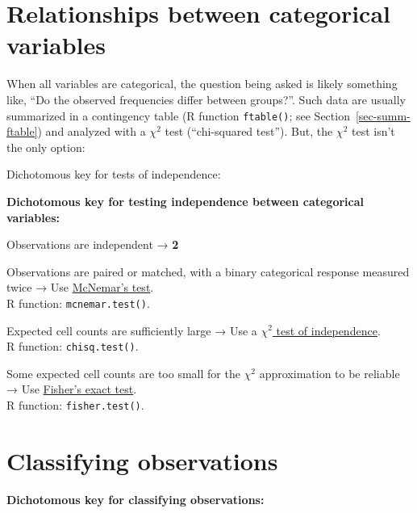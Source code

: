 \documentclass[
  13,
  letterpaper,
]{report}
\providecommand{\tightlist}{%
  \setlength{\itemsep}{0pt}\setlength{\parskip}{0pt}}
\begin{document}
\section{Relationships between categorical
variables}\label{sec-plan-cont-ind}

When all variables are categorical, the question being asked is likely
something like, ``Do the observed frequencies differ between groups?''.
Such data are usually summarized in a contingency table (R function
\texttt{ftable()}; see Section~\ref{sec-summ-ftable}) and analyzed with
a \(\chi^2\) test (``chi-squared test''). But, the \(\chi^2\) test isn't
the only option:

Dichotomous key for tests of independence:

\textbf{Dichotomous key for testing independence between categorical
variables:}

\begin{description}
\tightlist
\item[\textbf{1.}]
Observations are independent → \textbf{2}
\item[\textbf{1′.}]
Observations are paired or matched, with a binary categorical response
measured twice → Use \href{@sec-indep-mcnemar}{McNemar's test}.\\
R function: \texttt{mcnemar.test()}.
\item[\textbf{2.}]
Expected cell counts are sufficiently large → Use a
\href{@sec-indep-chisq}{\(\chi^2\) test of independence}.\\
R function: \texttt{chisq.test()}.
\item[\textbf{2′.}]
Some expected cell counts are too small for the \(\chi^2\) approximation
to be reliable → Use \href{@sec-indep-fisher}{Fisher's exact test}.\\
R function: \texttt{fisher.test()}.
\end{description}

\section{Classifying observations}\label{sec-plan-class}

\textbf{Dichotomous key for classifying observations:}
\end{document}
